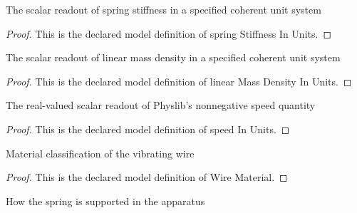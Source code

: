 \begin{definition}
  \label{def:physics:phyx-mini-0180:phyxminiproblems-problemphyxmini0180-springstiffnessinunits}
  The scalar readout of spring stiffness in a specified coherent unit system
\end{definition}
\begin{proof}
  This is the declared model definition of spring Stiffness In Units.
\end{proof}
\begin{definition}
  \label{def:physics:phyx-mini-0180:phyxminiproblems-problemphyxmini0180-linearmassdensityinunits}
  The scalar readout of linear mass density in a specified coherent unit system
\end{definition}
\begin{proof}
  This is the declared model definition of linear Mass Density In Units.
\end{proof}
\begin{definition}
  \label{def:physics:phyx-mini-0180:phyxminiproblems-problemphyxmini0180-speedinunits}
  The real-valued scalar readout of Physlib's nonnegative speed quantity
\end{definition}
\begin{proof}
  This is the declared model definition of speed In Units.
\end{proof}
\begin{definition}
  \label{def:physics:phyx-mini-0180:phyxminiproblems-problemphyxmini0180-wirematerial}
  Material classification of the vibrating wire
\end{definition}
\begin{proof}
  This is the declared model definition of Wire Material.
\end{proof}
\begin{definition}
  \label{def:physics:phyx-mini-0180:phyxminiproblems-problemphyxmini0180-springmount}
  How the spring is supported in the apparatus
\end{definition}
